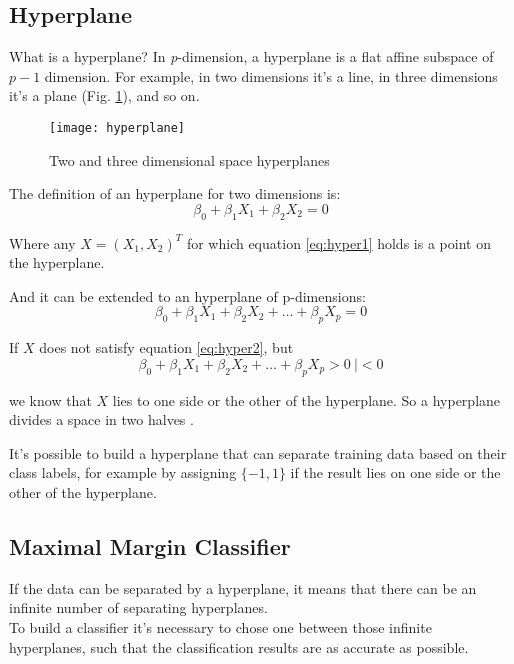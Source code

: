 \subsection{Hyperplane}
What is a hyperplane? In \textit{p}-dimension, a hyperplane is a flat affine subspace of $p - 1$ dimension. For example, in two dimensions it's a line, in three dimensions it's a plane (Fig. \ref{fig:hyperplane}), and so on.

\begin{figure}[H]
	\centering
	\texttt{[image: hyperplane]}
	\caption{Two and three dimensional space hyperplanes \cite{hyperplaneimg}}
	\label{fig:hyperplane}
\end{figure}

The definition of an hyperplane for two dimensions is:
\begin{equation} \label{eq:hyper1}
\beta_0 + \beta_1 X_1 + \beta_2 X_2 = 0
\end{equation}

Where any $X = (X_1, X_2)^T$ for which equation \ref{eq:hyper1} holds is a point on the hyperplane.

And it can be extended to an hyperplane of p-dimensions:
\begin{equation} \label{eq:hyper2}
\beta_0 + \beta_1 X_1 + \beta_2 X_2 + \dots + \beta_p X_p = 0
\end{equation}

If $X$ does not satisfy equation \ref{eq:hyper2}, but
\begin{equation} \label{eq:hyper3}
\beta_0 + \beta_1 X_1 + \beta_2 X_2 + \dots + \beta_p X_p > 0 \ | < 0
\end{equation}

we know that $X$ lies to one side or the other of the hyperplane. So a hyperplane divides a space in two halves \cite{ISLR}.

It's possible to build a hyperplane that can separate training data based on their class labels, for example by assigning $\{-1, 1\}$ if the result lies on one side or the other of the hyperplane.

\subsection{Maximal Margin Classifier}
If the data can be separated by a hyperplane, it means that there can be an infinite number of separating hyperplanes. \\
To build a classifier it's necessary to chose one between those infinite hyperplanes, such that the classification results are as accurate as possible.

